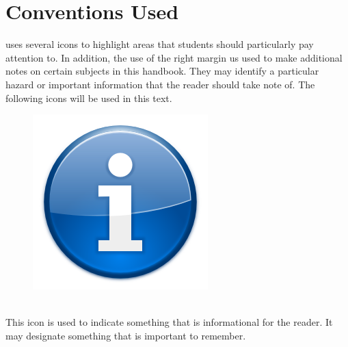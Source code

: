 \documentclass[nohyper,nobib]{tufte-book}
\begin{document}
\mainmatter

\chapter*{Conventions Used}

 uses several icons to highlight areas that students should particularly pay attention to.  In addition, the use of the right margin us used to make additional notes on certain subjects in this handbook.  They may identify a particular hazard or important information that the reader should take note of.  The following icons will be used in this text.

\begin{framed}
\begin{figure}
\includegraphics[width=\linewidth]{images/info_icon.png}
\end{figure}
\ \\
This icon is used to indicate something that is informational for the reader.  It may designate something that is important to remember.
\end{framed}
\end{document}
